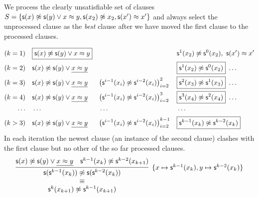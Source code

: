 \begin{example}
	We process the clearly unsatisfiable set of clauses
	\( S = \{
		\mathsf{s}(x)\not\approx \mathsf{s}(y)\lor {x\approx y},
		\mathsf{s}(x_2)\not\approx x_2, \mathsf{s}(x')\approx x'
		\} \)
	and always select the  unprocessed clause as the \emph{best} clause
	after we have moved the first clause to the processed clauses.

	\begin{align*}
		(k=1)\quad
		&\boxed{\mathsf{s}(x)\not\approx \mathsf{s}(y)\lor {x\approx y}} &
		&&
		&{ \mathsf{s}^1(x_2)\not\approx \mathsf{s}^0(x_2) },\ { \mathsf{s}(x')\approx x' }
		\\
		(k=2)\quad
		&\mathsf{s}(x)\not\approx \mathsf{s}(y)\lor \underline{x\approx y} &
		&&
		&\boxed{ \mathsf{s}^1(x_2)\not\approx \mathsf{s}^0(x_2) }\ \ldots
		\\
		(k=3)\quad
		&\mathsf{s}(x)\not\approx \mathsf{s}(y)\lor \underline{x\approx y} &
		&{\left(\mathsf{s}^{i-1}(x_{i})\not\approx \mathsf{s}^{i-2}(x_{i})\right)}_{i=2}^{2} &
		&\boxed{ \mathsf{s}^2(x_3)\not\approx \mathsf{s}^1(x_3) }\ \ldots
		\\
		(k=4)\quad
		&\mathsf{s}(x)\not\approx \mathsf{s}(y)\lor \underline{x\approx y} &
		&{\left(\mathsf{s}^{i-1}(x_{i})\not\approx \mathsf{s}^{i-2}(x_{i})\right)}_{i=2}^{3} &
		&\boxed{ \mathsf{s}^3(x_4)\not\approx \mathsf{s}^2(x_4) }\ \ldots
		\\
		\cdots\quad & \cdots && \cdots && \cdots
		\\
		(k>3)\quad
		&\mathsf{s}(x)\not\approx \mathsf{s}(y)\lor \underline{x\approx y} &
		&{\left(\mathsf{s}^{i-1}(x_{i})\not\approx \mathsf{s}^{i-2}(x_{i})\right)}_{i=2}^{k-1} &
		&\boxed{ \mathsf{s}^{k-1}(x_{k})\not\approx \mathsf{s}^{k-2}(x_{k}) }
		\end{align*}
		In each iteration the newest clause
		(an instance of the second clause)
		clashes with the first clause but no other of the so far processed clauses.
		\begin{gather*}
			\infer[
				\{x\mapsto\msucc^{k-1}(x_{k}),
				y\mapsto\msucc^{k-2}(x_{k})\}
				]{
					\begin{array}{c}
					\msucc(\msucc^{k-1}(x_{k}))\mNE \msucc(\msucc^{k-2}(x_{k}))
					\\ \equiv \\
					\msucc^{k}(x_{k+1})\mNE \msucc^{k-1}(x_{k+1})
					\end{array}
				}{
				\msucc(x)\mNE \msucc(y)\lor \underline{x\mEQ y} &
				\msucc^{k-1}(x_{k})\mNE \msucc^{k-2}(x_{k+1})
			}
		\end{gather*}
\end{example}



